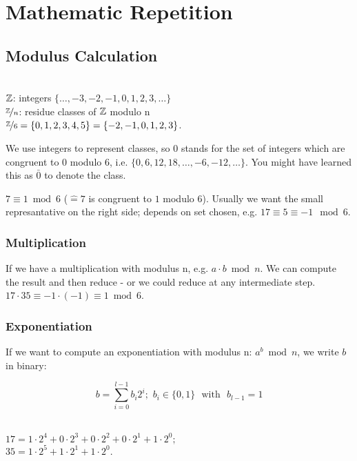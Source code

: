\chapter{Mathematic Repetition}

\section{Modulus Calculation}

\begin{notation} \ \\
$\mathbb{Z}$: integers $\{\dots,-3,-2,-1,0,1,2,3,\dots\}$ \\
$\nicefrac{\mathbb{Z}}{n}$: residue classes of $\mathbb{Z}$ modulo n \\
$\nicefrac{\mathbb{Z}}{6} = \{0,1,2,3,4,5\} = \{-2,-1,0,1,2,3\}$. \\
\end{notation}

We use integers to represent classes, so $0$ stands for the set of integers which are congruent to $0$ modulo $6$, i.e. $\{0,6,12,18,\dots,-6,-12,\dots\}$. You might have learned this as $\bar{0}$ to denote the class.

$7 \equiv 1 \bmod 6$ ($\widehat{=} 7$ is congruent to $1$ modulo $6$). Usually we want the small represantative on the right side; depends on set chosen, e.g. $17 \equiv 5 \equiv -1 \mod 6$.

\subsection{Multiplication}

If we have a multiplication with modulus n, e.g. $a \cdot b \bmod n$. We can compute the result and then reduce - or we could reduce at any intermediate step. $17 \cdot 35 \equiv -1 \cdot (-1) \equiv 1 \bmod 6$.

\subsection{Exponentiation}

If we want to compute an exponentiation with modulus n: $a^b \bmod n$, we write $b$ in binary:

\[
b = \sum\limits_{i=0}^{l-1} b_i 2^i;\,\, b_i \in \{0,1\} \,\, \text{ with } \,\, b_{l-1} = 1
\]

\begin{example} \ \\
$17 = 1 \cdot 2^4 + 0 \cdot 2^3 + 0 \cdot 2^2 + 0 \cdot 2^1 + 1 \cdot 2^0;$ \\ 
$35 = 1 \cdot 2^5 + 1 \cdot 2^1 + 1 \cdot 2^0$.
\end{example}

